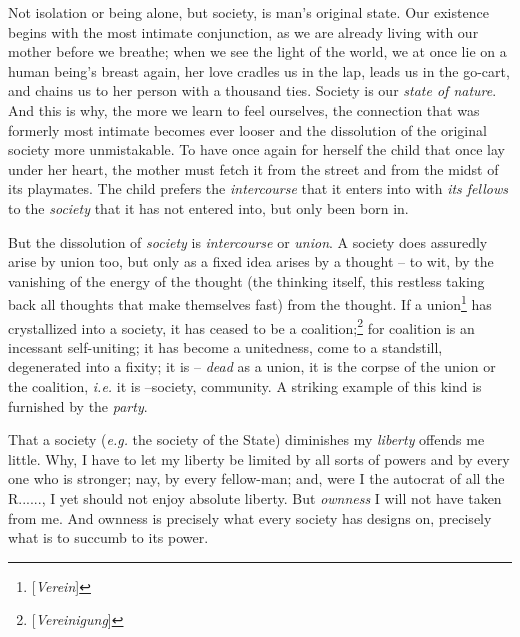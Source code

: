 Not isolation or being alone, but society, is man's original state. Our 
existence begins with the most intimate conjunction, as we are already living 
with our mother before we breathe; when we see the light of the world, we at 
once lie on a human being's breast again, her love cradles us in the lap, 
leads us in the go-cart, and chains us to her person with a thousand ties. 
Society is our \textit{state of nature}. And this is why, the more we learn to 
feel ourselves, the connection that was formerly most intimate becomes ever 
looser and the dissolution of the original society more unmistakable. To have 
once again for herself the child that once lay under her heart, the mother 
must fetch it from the street and from the midst of its playmates. The child 
prefers the \textit{intercourse} that it enters into with \textit{its fellows} 
to the \textit{society} that it has not entered into, but only been born in.

But the dissolution of \textit{society} is \textit{intercourse} or 
\textit{union}. A society does assuredly arise by union too, but only as a 
fixed idea arises by a thought -- to wit, by the vanishing of the energy of 
the thought (the thinking itself, this restless taking back all thoughts that 
make themselves fast) from the thought. If a union\footnote{[\textit{Verein}]} 
has crystallized into a society, it has ceased to be a 
coalition;\footnote{[\textit{Vereinigung}]} for coalition is an incessant 
self-uniting; it has become a unitedness, come to a standstill, degenerated 
into a fixity; it is -- \textit{dead} as a union, it is the corpse of the 
union or the coalition, \textit{i.e.} it is --society, community. A striking 
example of this kind is furnished by the \textit{party}.

That a society (\textit{e.g.} the society of the State) diminishes my 
\textit{liberty} offends me little. Why, I have to let my liberty be limited 
by all sorts of powers and by every one who is stronger; nay, by every 
fellow-man; and, were I the autocrat of all the R......, I yet should not 
enjoy absolute liberty. But \textit{ownness} I will not have taken from me. 
And ownness is precisely what every society has designs on, precisely what is 
to succumb to its power.

